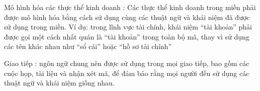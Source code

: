 Mô hình hóa các thực thể kinh doanh : Các thực thể kinh doanh trong miền phải được mô hình hóa bằng cách sử dụng cùng các thuật ngữ và khái niệm đã được sử dụng trong miền. Ví dụ: trong lĩnh vực tài chính, khái niệm “tài khoản” phải được gọi một cách nhất quán là “tài khoản” trong toàn bộ mã, thay vì sử dụng các tên khác nhau như “sổ cái” hoặc “hồ sơ tài chính”

Giao tiếp : ngôn ngữ chung nên được sử dụng trong mọi giao tiếp, bao gồm các cuộc họp, tài liệu và nhận xét mã, để đảm bảo rằng mọi người đều sử dụng các thuật ngữ và khái niệm giống nhau.


